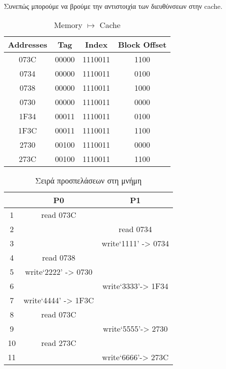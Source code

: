 \documentclass[a4paper,12pt]{article}
\begin{document}
Συνεπώς μπορούμε να βρούμε την αντιστοιχία των διευθύνσεων στην cache.

\begin{table}[H]
    \centering
    \begin{tabular}{c | c c c}
        Addresses & Tag & Index & Block Offset \\
        \hline
        073C & 00000 & 1110011 & 1100 \\
        0734 & 00000 & 1110011 & 0100 \\
        0738 & 00000 & 1110011 & 1000 \\
        0730 & 00000 & 1110011 & 0000 \\
        1F34 & 00011 & 1110011 & 0100 \\
        1F3C & 00011 & 1110011 & 1100 \\
        2730 & 00100 & 1110011 & 0000 \\
        273C & 00100 & 1110011 & 1100 \\
    \end{tabular}
    \caption{Memory $\mapsto$ Cache}
    \label{fig:T6}
\end{table}


\begin{table}[H]
    \centering
    \begin{tabular}{| c | c c |}
            \hline
            & P0                    & P1                    \\
            \hline
        1   & read 073C             &                       \\
            \hline
        2   &                       & read 0734             \\
            \hline
        3   &                       & write‘1111’ -> 0734   \\
            \hline
        4   & read 0738             &                       \\
            \hline
        5   & write‘2222’ -> 0730   &                       \\
            \hline
        6   &                       & write‘3333’-> 1F34    \\
            \hline
        7   & write‘4444’ -> 1F3C   &                       \\
            \hline
        8   & read 073C             &                       \\
            \hline
        9   &                       & write‘5555’-> 2730    \\
            \hline
        10  & read 273C             &                       \\
            \hline
        11  &                       & write‘6666’-> 273C    \\
            \hline
    \end{tabular}
    \caption{Σειρά προσπελάσεων στη μνήμη}
    \label{fig:T7}
\end{table}
\end{document}
